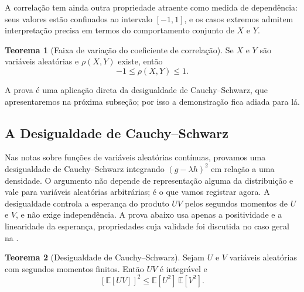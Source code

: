 \documentclass[12pt,portuguese]{article}
\theoremstyle{definition}
\newtheorem{theorem}{Teorema}
\theoremstyle{plainexercise}
\theoremstyle{starredexercise}
\theoremstyle{definition}
\begin{document}
A correlação tem ainda outra propriedade atraente como medida de dependência:
seus valores estão confinados ao intervalo $[-1,1]$, e os casos extremos
admitem interpretação precisa em termos do comportamento conjunto de $X$ e $Y$.

\begin{theorem}[Faixa de variação do coeficiente de correlação]\label{thm:correlacao-intervalo}
Se $X$ e $Y$ são variáveis aleatórias e $\rho(X,Y)$ existe, então
\begin{equation}\label{eq:correlacao-intervalo}
-1\leqslant\rho(X,Y)\leqslant 1.
\end{equation}
\end{theorem}

A prova é uma aplicação direta da desigualdade de Cauchy--Schwarz, que
apresentaremos na próxima subseção; por isso a demonstração fica adiada para
lá.

\subsection{A Desigualdade de Cauchy--Schwarz}\label{subsec:cauchy-schwarz}

Nas notas sobre funções de variáveis aleatórias contínuas, provamos uma
desigualdade de Cauchy--Schwarz integrando $(g-\lambda h)^2$ em relação a uma
densidade. O argumento não depende de representação alguma da distribuição e
vale para variáveis aleatórias arbitrárias; é o que vamos registrar agora.
A desigualdade controla a esperança do produto $UV$ pelos segundos
momentos de $U$ e $V$, e não exige independência. A prova abaixo usa apenas
a positividade e a linearidade da esperança, propriedades 
cuja validade foi discutida no caso geral na
.

\begin{theorem}[Desigualdade de Cauchy--Schwarz]\label{thm:cauchy-schwarz}
Sejam $U$ e $V$ variáveis aleatórias com segundos momentos finitos. Então
$UV$ é integrável e
\begin{equation}\label{eq:cauchy-schwarz}
  [\mathbb{E}[UV]]^2
  \leqslant
  \mathbb{E}[U^2]\,\mathbb{E}[V^2].
\end{equation}
\end{theorem}
\end{document}
